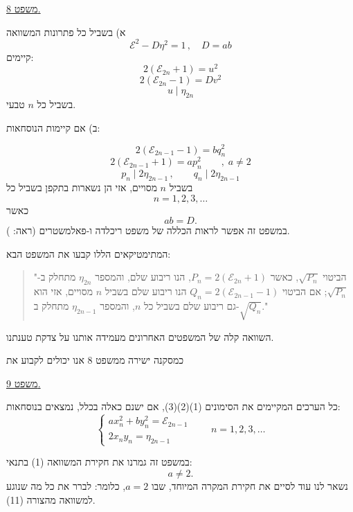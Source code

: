\medskip
\noindent\underline{משפט 8.}

\noindent א) בשביל כל פתרונות המשוואה
\[ \mathcal{E}^2 - D\eta^2 = 1 \, , \quad D = ab \]
קיימים:
\[ 2(\mathcal{E}_{2n} + 1) = u^2 \]
\[ 2(\mathcal{E}_{2n} - 1) = Dv^2 \]
\[ u \mid \eta_{2n} \]
בשביל כל $n$ טבעי.

\noindent ב) אם קיימות הנוסחאות:

\[ 2(\mathcal{E}_{2n-1} - 1) = bq_n^2 \]
\[ 2(\mathcal{E}_{2n-1} + 1) = ap_n^2 \qquad , \; a \neq 2 \]
\[ p_n \mid 2\eta_{2n-1} \, , \qquad q_n \mid 2\eta_{2n-1} \]
בשביל $n$ מסויים, אזי הן נשארות בתקפן בשביל כל
\[ n = 1 , 2 , 3 , \ldots \]
כאשר
\[ ab = D. \]
במשפט זה אפשר לראות הכללה של משפט ריכלדה ו-פאלמשטרים (ראה: ).

\noindent המתימטיקאים הללו קבעו את המשפט הבא:

\begin{quote}
"הביטוי $\sqrt{P_n}$, כאשר $P_n = 2(\mathcal{E}_{2n} + 1)$, הנו ריבוע שלם, והמספר $\eta_{2n}$ מתחלק ב-$\sqrt{P_n}$; אם הביטוי $Q_n = 2(\mathcal{E}_{2n-1} - 1)$ הנו ריבוע שלם בשביל $n$ מסויים, אזי הוא גם ריבוע שלם בשביל כל $n$, והמספר $\eta_{2n-1}$ מתחלק ב-$\sqrt{Q_n}$."
\end{quote}

\noindent השוואה קלה של המשפטים האחרונים מעמידה אותנו על צדקת טענתנו.

\noindent כמסקנה ישירה ממשפט 8 אנו יכולים לקבוע את

\medskip
\noindent\underline{משפט 9.}

\noindent כל הערכים המקיימים את הסימונים (1)(2)(3), אם ישנם כאלה בכלל, נמצאים בנוסחאות:
\[ \begin{cases} ax_n^2 + by_n^2 = \mathcal{E}_{2n-1} \\ 2x_ny_n = \eta_{2n-1} \end{cases} \qquad n = 1 , 2 , 3 , \ldots \tag{12} \]

\noindent במשפט זה גמרנו את חקירת המשוואה (1) בתנאי:
\[ a \neq 2 . \]
נשאר לנו עוד לסיים את חקירת המקרה המיוחד, שבו $a=2$, כלומר: לברר את כל מה שנוגע למשוואה מהצורה (11).

